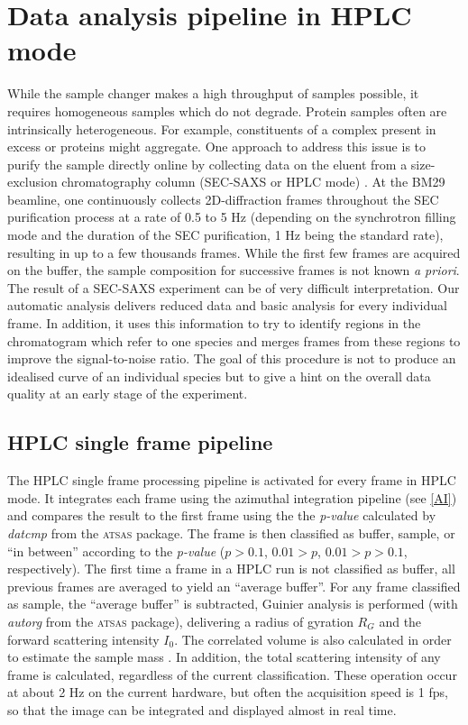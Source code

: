 \documentclass[preprint,pdf]{iucr}              %
\begin{document}
\section{Data analysis pipeline in HPLC mode}
While the sample changer makes a high throughput of samples possible, it
requires homogeneous samples which do not degrade.
Protein samples often are intrinsically heterogeneous.
For example, constituents of a complex present in excess or proteins
might aggregate.
One approach to address this issue is to purify the sample directly online by collecting data
on the eluent from a size-exclusion chromatography column (SEC-SAXS or HPLC
mode) \cite{SECPaper2012,SECP12,SECSWING}.
At the BM29 beamline, one continuously collects 2D-diffraction frames
throughout the SEC purification process at a rate of 0.5 to 5 Hz
(depending on the synchrotron filling mode and the duration of the SEC
purification, 1 Hz being the standard rate), resulting in up to a few thousands
frames.
While the first few frames are acquired on the buffer, the sample composition
for successive frames is not known \textit{a priori}.
The result of a SEC-SAXS experiment can be of very difficult interpretation.
Our automatic analysis delivers reduced data and basic analysis for
every individual frame.
In addition, it uses this information to try to identify regions in the
chromatogram which refer to one species and merges frames from these
regions to improve the signal-to-noise ratio.
The goal of this procedure is not to produce an idealised curve of an individual
species but to give a hint on the overall data quality at an early stage of
the experiment.

\subsection{HPLC single frame pipeline}

The HPLC single frame processing pipeline is activated for every frame in HPLC
mode.
It integrates each frame using the azimuthal integration pipeline (see
\ref{AI}) and compares the result to the first frame using the the
\textit{p-value} calculated by \textit{datcmp} from the \textsc{atsas} package.
The frame is then classified as buffer, sample, or ``in between''
according to the \textit{p-value} ($p>0.1$, $0.01 > p$, $0.01>p>0.1$, 
respectively).
The first time a frame in a HPLC run is not classified as buffer, all previous
frames are averaged to yield an ``average buffer''.
For any frame classified as sample, the ``average buffer'' is subtracted, Guinier
analysis is performed (with \textit{autorg} from the \textsc{atsas} package),
delivering a radius of gyration $R_G$ and the forward scattering intensity
$I_0$. The correlated volume is also calculated in order to estimate the
sample mass \cite{RamboTainerNature2013}.
In addition, the total scattering intensity of any
frame is calculated, regardless of the current classification.
These operation occur at about 2 Hz on the current hardware, but often the
acquisition speed is 1 fps, so that the image can be integrated and displayed
almost in real time.
\end{document}
